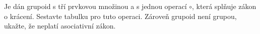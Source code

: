 Je dán grupoid s tří prvkovou množinou a s jednou operací $\circ$, která splňuje
zákon o krácení. Sestavte tabulku pro tuto operaci. Zároveň grupoid není grupou,
ukažte, že neplatí asociativní zákon.
